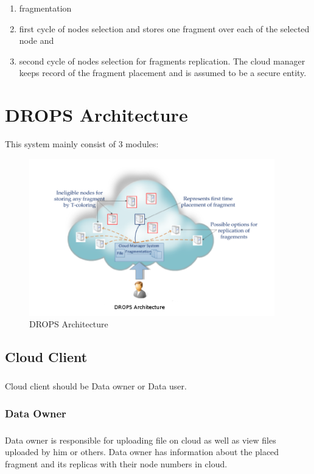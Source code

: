 \begin{enumerate}
	\item fragmentation
	\item first cycle of nodes selection and stores one fragment over each of the selected node and
	\item second cycle of nodes selection for fragments replication. The cloud manager keeps
	record of the fragment placement and is assumed to be a secure entity.
\end{enumerate}

\chapter{ DROPS Architecture}

This system mainly consist of 3 modules:
\begin{figure}
	\centering
	\includegraphics[width=0.95\textwidth]{./droparchitecture.png}
	\caption{DROPS Architecture}
\end{figure}
\section{Cloud Client}
\paragraph*{} 
Cloud client should be Data owner or Data user.
\subsection{Data Owner}
\paragraph*{}
Data owner is responsible for uploading file on cloud as well as view files uploaded by him or others. Data owner has information about the placed fragment and its replicas with their node numbers in cloud. 
